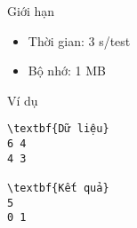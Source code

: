 Giới hạn
\begin{itemize}   Kích thước: 0 $<$ a, b ≤ 500   
	\item     Thời gian: 3 s/test   
	\item     Bộ nhớ: 1 MB   
\end{itemize}
Ví dụ
\begin{verbatim}
\textbf{Dữ liệu}
6 4
4 3	

\textbf{Kết quả}
5
0 1
\end{verbatim}